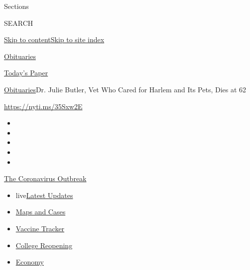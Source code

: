Sections

SEARCH

\protect\hyperlink{site-content}{Skip to
content}\protect\hyperlink{site-index}{Skip to site index}

\href{https://www.nytimes.com/section/obituaries}{Obituaries}

\href{https://myaccount.nytimes.com/auth/login?response_type=cookie\&client_id=vi}{}

\href{https://www.nytimes.com/section/todayspaper}{Today's Paper}

\href{/section/obituaries}{Obituaries}\textbar{}Dr. Julie Butler, Vet
Who Cared for Harlem and Its Pets, Dies at 62

\url{https://nyti.ms/35Sxw2E}

\begin{itemize}
\item
\item
\item
\item
\item
\end{itemize}

\href{https://www.nytimes.com/news-event/coronavirus?action=click\&pgtype=Article\&state=default\&region=TOP_BANNER\&context=storylines_menu}{The
Coronavirus Outbreak}

\begin{itemize}
\tightlist
\item
  live\href{https://www.nytimes.com/2020/08/03/world/coronavirus-covid-19.html?action=click\&pgtype=Article\&state=default\&region=TOP_BANNER\&context=storylines_menu}{Latest
  Updates}
\item
  \href{https://www.nytimes.com/interactive/2020/us/coronavirus-us-cases.html?action=click\&pgtype=Article\&state=default\&region=TOP_BANNER\&context=storylines_menu}{Maps
  and Cases}
\item
  \href{https://www.nytimes.com/interactive/2020/science/coronavirus-vaccine-tracker.html?action=click\&pgtype=Article\&state=default\&region=TOP_BANNER\&context=storylines_menu}{Vaccine
  Tracker}
\item
  \href{https://www.nytimes.com/2020/08/02/us/covid-college-reopening.html?action=click\&pgtype=Article\&state=default\&region=TOP_BANNER\&context=storylines_menu}{College
  Reopening}
\item
  \href{https://www.nytimes.com/live/2020/08/03/business/stock-market-today-coronavirus?action=click\&pgtype=Article\&state=default\&region=TOP_BANNER\&context=storylines_menu}{Economy}
\end{itemize}

